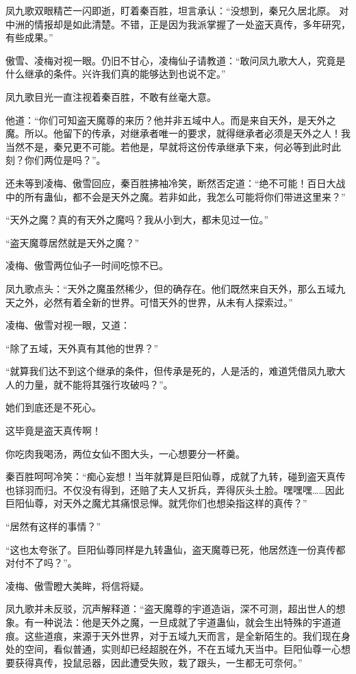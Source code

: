 \begin{this_body}
凤九歌双眼精芒一闪即逝，盯着秦百胜，坦言承认：“没想到，秦兄久居北原。 对中洲的情报却是如此清楚。不错，正是因为我派掌握了一处盗天真传，多年研究，有些成果。”

傲雪、凌梅对视一眼。仍旧不甘心，凌梅仙子请教道：“敢问凤九歌大人，究竟是什么继承的条件。兴许我们真的能够达到也说不定。”

凤九歌目光一直注视着秦百胜，不敢有丝毫大意。

他道：“你们可知盗天魔尊的来历？他并非五域中人。而是来自天外，是天外之魔。所以。他留下的传承，对继承者唯一的要求，就得继承者必须是天外之人！我当然不是，秦兄更不可能。若他是，早就将这份传承继承下来，何必等到此时此刻？你们两位是吗？”。

还未等到凌梅、傲雪回应，秦百胜拂袖冷笑，断然否定道：“绝不可能！百日大战中的所有蛊仙，都不会是天外之魔。若非如此，我怎么可能将你们带进这里来？”

“天外之魔？真的有天外之魔吗？我从小到大，都未见过一位。”

“盗天魔尊居然就是天外之魔？”

凌梅、傲雪两位仙子一时间吃惊不已。

凤九歌点头：“天外之魔虽然稀少，但的确存在。他们既然来自天外，那么五域九天之外，必然有着全新的世界。可惜天外的世界，从未有人探索过。”

凌梅、傲雪对视一眼，又道：

“除了五域，天外真有其他的世界？”

“就算我们达不到这个继承的条件，但传承是死的，人是活的，难道凭借凤九歌大人的力量，就不能将其强行攻破吗？”。

她们到底还是不死心。

这毕竟是盗天真传啊！

你吃肉我喝汤，两位女仙不图大头，一心想要分一杯羹。

秦百胜呵呵冷笑：“痴心妄想！当年就算是巨阳仙尊，成就了九转，碰到盗天真传也铩羽而归。不仅没有得到，还赔了夫人又折兵，弄得灰头土脸。嘿嘿嘿……因此巨阳仙尊，对天外之魔尤其痛恨忌惮。就凭你们也想染指这样的真传？”

“居然有这样的事情？”

“这也太夸张了。巨阳仙尊同样是九转蛊仙，盗天魔尊已死，他居然连一份真传都对付不了吗？”。

凌梅、傲雪瞪大美眸，将信将疑。

凤九歌并未反驳，沉声解释道：“盗天魔尊的宇道造诣，深不可测，超出世人的想象。有一种说法：他是天外之魔，一旦成就了宇道蛊仙，就会生出特殊的宇道道痕。这些道痕，来源于天外世界，对于五域九天而言，是全新陌生的。我们现在身处的空间，看似普通，实则却已经超脱在外，不在五域九天当中。巨阳仙尊一心想要获得真传，投鼠忌器，因此遭受失败，栽了跟头，一生都无可奈何。”


\end{this_body}
